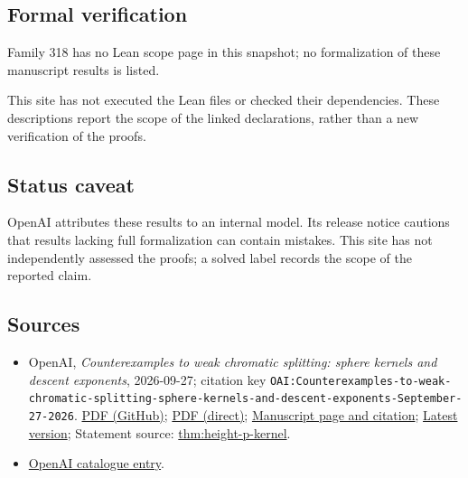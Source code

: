 \documentclass[11pt]{article}
\begin{document}
\subsection{Formal verification}
Family 318 has no Lean scope page in this snapshot; no formalization of these manuscript results is listed.

This site has not executed the Lean files or checked their dependencies. These descriptions report the scope of the linked declarations, rather than a new verification of the proofs.

\subsection{Status caveat}
OpenAI attributes these results to an internal model. Its release notice cautions that results lacking full formalization can contain mistakes. This site has not independently assessed the proofs; a solved label records the scope of the reported claim.

\subsection{Sources}
\begin{itemize}
\item OpenAI, \emph{Counterexamples to weak chromatic splitting: sphere kernels and descent exponents}, 2026-09-27; citation key \texttt{OAI:Counterexamples-to-weak-chromatic-splitting-sphere-kernels-and-descent-exponents-September-27-2026}. \href{https://github.com/openai/math/blob/adc7f1241b42e322a6451854ab7e4b4c146bf78a/preprints/Counterexamples-to-weak-chromatic-splitting-sphere-kernels-and-descent-exponents-September-27-2026/paper.pdf}{PDF (GitHub)}; \href{https://github.com/openai/math/raw/adc7f1241b42e322a6451854ab7e4b4c146bf78a/preprints/Counterexamples-to-weak-chromatic-splitting-sphere-kernels-and-descent-exponents-September-27-2026/paper.pdf}{PDF (direct)}; \href{https://github.com/openai/math/blob/adc7f1241b42e322a6451854ab7e4b4c146bf78a/preprints/Counterexamples-to-weak-chromatic-splitting-sphere-kernels-and-descent-exponents-September-27-2026/README.md}{Manuscript page and citation}; \href{https://github.com/openai/math/blob/main/preprints/Counterexamples-to-weak-chromatic-splitting-sphere-kernels-and-descent-exponents-September-27-2026/paper.pdf}{Latest version}; Statement source: \href{https://github.com/openai/math/blob/adc7f1241b42e322a6451854ab7e4b4c146bf78a/preprints/Counterexamples-to-weak-chromatic-splitting-sphere-kernels-and-descent-exponents-September-27-2026/build/sections/01-introduction.tex\#L30}{thm:height-p-kernel}.
\item \href{https://github.com/openai/math/blob/adc7f1241b42e322a6451854ab7e4b4c146bf78a/CONTENTS.md}{OpenAI catalogue entry}.
\end{itemize}
\end{document}
